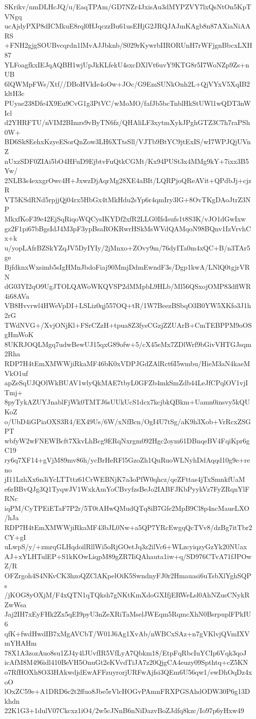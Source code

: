 SKrikv/nmDLHcJQ/u/EaqTPAm/GD7NZr4JxisAu3dMYPZVY7lxQsNtOn5KpTVNgq
ucAjdyPXP8dICMkuE8rql0HJqczzBu61usEHjG2JRQJAJmKAgb8n87AXiaNiAARS
+FNH2gjgSOUBvcqrdn1lMvAJJbknb/S029rKywrbIIRORUnH7rWFjgnBbcxLXH87
YLFoagfkxIEJqAQBH1wjUpJkKLfekU4sxcDXlVt6uvY9KTG8r5I7WoNZp9Zs+nUB
6lQWMpFWs/Xtf//DBoHVkIe4oOw+JOc/G9EmSUNkOnh2L+QjVYxV5XqIB2kltH3c
PUyae238Dfe4X9Eu9CvG1g3PtVC/wMoMO/fafJb5bcTnblHkStUWl1wQDT3nWIcl
d2YHRFTU/nVIM2BImrs9vByTN6fz/QHAliLF3xytmXykJPghGTZ3C7h7raPSh0W+
BD6Sk8EehxKzyeESorQnZow3LH6XTtsSll/VJTb9BtYC9jtExIS/wI7WPJQjUVnZ
nUxzSDF0ZIAi5bO4HFuD9EjbtvFuQtkCGMt/Kx94PUSt3x4MMg9kY+7ixx3B5Yw/
2NLB3s4exxgrOwc4H+JxwzDjAqrMg28XE4aBIt/LQRPjoQReAVit+QPdbJj+cjzR
VT5KSdRNd5rpjjQj04rx5HbGx4tMkHdu2sYp6r4qmIry3lG+8OvTKgDAoJtrZ3NP
MkxfKoF39e42EjSqRiqoWQCysIKYDf2xfR2LLG0IfsIsufs1t8S3K/vJO1dGwIxw
gz2F1pi67bBgsIdJ4M3pF3ypBsaROKRwrHSkMsWVdQAMqoN98BQnv1IzVrvhCx+k
u/yopLAfrBZSkYZqJV5DyIYIy/2jMnxo+ZOvy9m/76dyITa0m4xQC+B/n3TAr5ge
BjfdknxWxsimb5sIgHMnJbdoFiaj90MmjDdmEwndF3s/Dgp1kwA/LNlQ0tgjrVRN
dG03YI2qO9UgJTOLQAWoWKQVSP2dMMpbL9HLb/Ml56QSxojOMP83dflWR4i68AVa
VB8Hvvrwl4HWeVpDI+LSLiz0qj557OQ+tR/1W7BeezBSbqO3B0YW5XKfo3J1h2rG
TWdNVG+/XvjONjKl+FSrCZzH+tpua8Z3fysCGzjZZUArB+CmTEBPPM9oOSgHmWoK
8UKRJOQLMgq7udwBewUJ15qxG89ofw+5/cX45eMx7ZDlWrf9bGivVHTGJsqm2Rha
RDP7H4tEmXMWWjiRkaMF46bK0xVDPJGdZAlRct6I5wmbu/HieM3aN4kaeMVkO1uf
apZeSqUJQOlWkBUAV1wlyQkMAE7tbyL0GFZb4mkSmZdb44LeJfCPqlOV1vjITmj+
8pyTykAZUYJnablFjWk0TMTJ6sUUkUcS1dcx7kcjbkQBkm+Uamn0insvy5kQUKoZ
o/UbD4iGPiaOXS3R4/EX49Us/6W/xNfBcn/OgI4U7tSg/aK9h3Xob+VrRcxZSGPT
wbfyW2wFNEWBcft7XkvLhBcg9ERqNxrgm092Hgc2oym61DBnqeBV4FqiKpr6gC19
ry6q7XF14+gVjM89mv86h/ycBrHeRFl5GzoZh1QuRuoWLNyhDdAqqd10g9e+reno
jI11LzhXx6n3iYcLTTttz61CrWEBNjK7a3oPfW0qhcz/qeZFttas4jTxSmnkfUaM
e6rBBvQJg3Q1TyqwJV1WxkAmYoCBvyfzsBeJo2IABFJKbPyykVz7FyZRqnYlFRNc
iqPM/CyTPEiETaF7P2r/5T0tAHwQMudQTq8iB7Gfe2MpB9Cl8p4ncMaueLXO/hJa
RDP7H4tEmXMWWjiRkaMF43bJL0Nw+a5QP7YRcEwgqQcTVv8/dzBg7itTbr2CY+gI
uLwpS/y/+zmrqGLHqdoilRllWi5oRjGOetJq3z2ilVc6+WLzcyiqzyGzYk20NUax
AJ+xYLHTulEP+S1kKOwLiqpM89gZR7IiQAhauta1iw+q/SD976CTvA71fJPOwZ/R
OFZrgoh4S4NKvCK3hzoQZClAKpelOiK5SwndnyFJ0r2Hmauasi6uTsbXlYghSQPs
/jKOG8yOXjM/F4xQTN1qTQksh7gNKtKmXdoGXIfjERWeLsl0AhNZusCNykRZwWsa
Jaj2IH7xEyFHk2Zx5qEI9pyU3nZeXRiTaMselJWEqm5RqmcXhN0BsrpuplFPkIU6
qfK+fwdHwdIB7xMgAVCbT/W01J6Ag1XvAb/nWBCxSAz+n7gVKlvjQVmIXVmYHAHm
78X1A3zozAuo8su1ZJ4y4lJUvfIR5VfLyA7Qbkm18/EtpFqRbcIuYCIp6Vqk3qoJ
icAfM8M496idl410BeVH5OnuGt2eKVvdTiJA7z20QjgCA4euzy09Spthtq+cZ5KN
o7RfHOXh8O33HAkwdjdEwAFFzuyrorjURFwAjfsi3QEm6U56qw1/ewDhOqDz4xoO
lOxZC59e+A1DRD6c2t2ffuo8Jbe5rVlcHOGvPAmnFRXPGSAhdODW30P6g13Dkhdn
22K1G3+1dulV07Ckcxz1iO4/2w5cJNnB6nNiDazvBoZJdfq8kzc/Io97p6yHxw49
